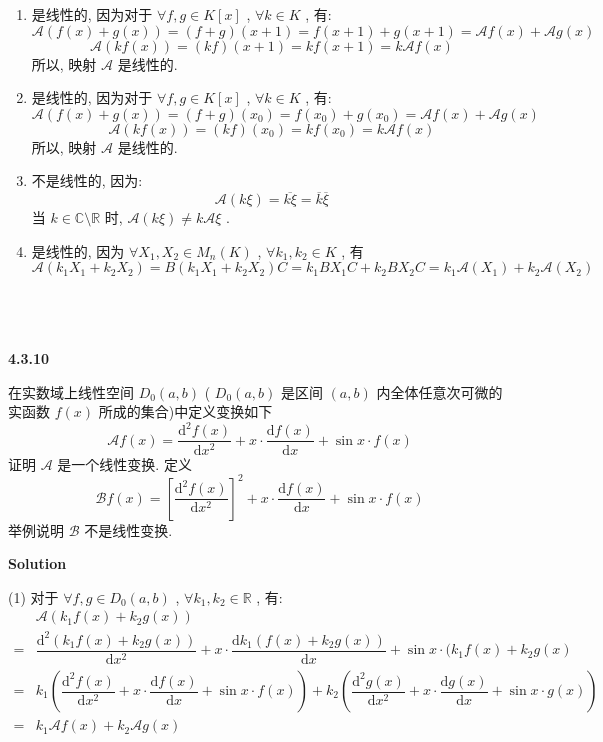 \documentclass[11pt,a4paper,openany,oneside]{book}
\newcommand\Solution{\noindent\textbf{\textsf{Solution}}\par\medskip}
\begin{document}
\begin{enumerate}[(1)]
\item 是线性的, 因为对于 $ \forall f, g \in K[x] $ ,  $ \forall k \in K $ , 有:
 $$  \mathcal{A}(f(x) + g(x)) = (f+g)(x+1) = f(x+1) + g(x+1) = \mathcal{A}f(x) + \mathcal{A}g(x)  $$ 
 $$  \mathcal{A}(kf(x)) = (kf)(x+1) = kf(x+1) = k\mathcal{A}f(x)  $$ 
所以, 映射 $ \mathcal{A} $ 是线性的. \\

\item 是线性的, 因为对于 $ \forall f, g \in K[x] $ ,  $ \forall k \in K $ , 有:
 $$  \mathcal{A}(f(x)+g(x)) = (f+g)(x_0) = f(x_0) + g(x_0) = \mathcal{A}f(x) + \mathcal{A}g(x)  $$ 
 $$  \mathcal{A}(kf(x)) = (kf)(x_0) = kf(x_0) = k\mathcal{A}f(x)  $$ 
所以, 映射 $ \mathcal{A} $ 是线性的. \\

\item 不是线性的, 因为:
 $$  \mathcal{A}(k\xi) = \overline{k\xi} = \overline{k}\overline{\xi}  $$ 
当 $ k \in \mathbb{C} \setminus \mathbb{R}  $ 时,  $ \mathcal{A}(k\xi) \neq k\mathcal{A}\xi $ . \\

\item 是线性的, 因为 $ \forall X_1,X_2 \in M_n(K) $ ,  $ \forall k_1, k_2 \in K $ , 有
 $$  \mathcal{A}(k_1X_1 + k_2X_2) = B(k_1X_1 + k_2X_2)C = k_1BX_1C + k_2BX_2C = k_1\mathcal{A}(X_1) + k_2\mathcal{A}(X_2)  $$   \\  \\  \\
\end{enumerate}

\begin{myexample}
	\textbf{4.3.10}

在实数域上线性空间 $ D_0(a,b) $ ( $ D_0(a,b) $ 是区间 $ (a,b) $ 内全体任意次可微的实函数 $ f(x) $ 所成的集合)中定义变换如下
 $$  \mathcal{A}f(x) = \dfrac{\mathrm{d}^2f(x)}{\mathrm{d}x^2} + x \cdot \dfrac{\mathrm{d}f(x)}{\mathrm{d}x} + \sin x \cdot f(x)  $$ 
证明 $ \mathcal{A} $ 是一个线性变换. 定义
 $$  \mathcal{B}f(x) = \left[\dfrac{\mathrm{d}^2f(x)}{\mathrm{d}x^2} \right]^2 + x \cdot \dfrac{\mathrm{d}f(x)}{\mathrm{d}x} + \sin x \cdot f(x)   $$ 
举例说明 $ \mathcal{B} $ 不是线性变换.   \\ 

\end{myexample}
\Solution 

(1) 对于 $ \forall f, g \in D_0(a,b) $ ,  $ \forall k_1, k_2 \in \mathbb{R} $ , 有:
\begin{align*}
&\mathcal{A}(k_1f(x)+k_2g(x))\\ =&\dfrac{\mathrm{d}^2(k_1f(x)+k_2g(x))}{\mathrm{d}x^2} + x \cdot \dfrac{\mathrm{d}k_1(f(x)+k_2g(x))}{\mathrm{d}x} + \sin x \cdot (k_1f(x)+ k_2g(x)  \\
=&k_1(\dfrac{\mathrm{d}^2f(x)}{\mathrm{d}x^2} + x \cdot \dfrac{\mathrm{d}f(x)}{\mathrm{d}x} + \sin x \cdot f(x)) + k_2(\dfrac{\mathrm{d}^2g(x)}{\mathrm{d}x^2} + x \cdot \dfrac{\mathrm{d}g(x)}{\mathrm{d}x} + \sin x \cdot g(x))  \\ 
=& k_1 \mathcal{A}f(x) + k_2 \mathcal{A}g(x)
\end{align*}
\end{document}
